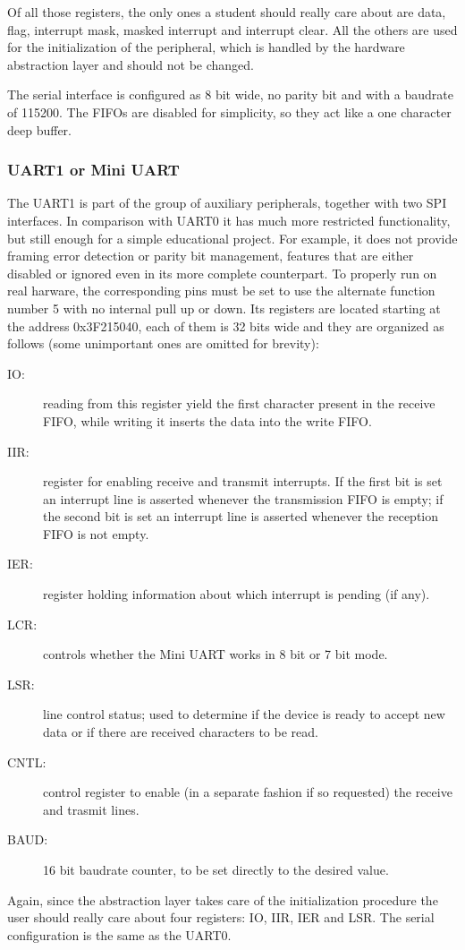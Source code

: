 \documentclass[12pt,a4paper,openright,twoside]{report}
\begin{document}
Of all those registers, the only ones a student should really care about are
data, flag, interrupt mask, masked interrupt and interrupt clear. All the others 
are used for the initialization of the peripheral, which is handled by the 
hardware abstraction layer and should not be changed.

The serial interface is configured as 8 bit wide, no parity bit and with
a baudrate of 115200. The FIFOs are disabled for simplicity, so they act like 
a one character deep buffer.

\subsubsection{UART1 or Mini UART}
The UART1 is part of the group of auxiliary peripherals, together with two SPI
interfaces. In comparison with UART0 it has much more restricted functionality,
but still enough for a simple educational project. For example, it does not 
provide framing error detection or parity bit management, features that are either
disabled or ignored even in its more complete counterpart.
To properly run on real harware, the corresponding pins must be set to use the
alternate function number 5 with no internal pull up or down.
Its registers are located starting at the address 0x3F215040, each of them is 32 bits
wide and they are organized as follows (some unimportant ones are omitted for brevity):

\begin{description}
    \item[IO:] reading from this register yield the first character present in the
            receive FIFO, while writing it inserts the data into the write FIFO.
    \item[IIR:] register for enabling receive and transmit interrupts. If the first
            bit is set an interrupt line is asserted whenever the transmission FIFO
            is empty; if the second bit is set an interrupt line is asserted whenever
            the reception FIFO is not empty.
    \item[IER:] register holding information about which interrupt is pending (if any).
    \item[LCR:] controls whether the Mini UART works in 8 bit or 7 bit mode.
    \item[LSR:] line control status; used to determine if the device is ready to 
            accept new data or if there are received characters to be read.
    \item[CNTL:] control register to enable (in a separate fashion if so requested)
            the receive and trasmit lines.
    \item[BAUD:] 16 bit baudrate counter, to be set directly to the desired value.
\end{description}
Again, since the abstraction layer takes care of the initialization procedure
the user should really care about four registers: IO, IIR, IER and LSR.
The serial configuration is the same as the UART0.
\end{document}
